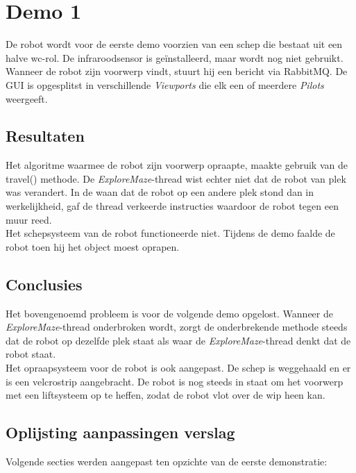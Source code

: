 \documentclass[tt2]{penoverslag}
\begin{document}
\section{Demo 1} %
\label{Asec:demo1}
De robot wordt voor de eerste demo voorzien van een schep die bestaat uit een halve wc-rol. De infraroodsensor is ge\"installeerd, maar wordt nog niet gebruikt. Wanneer de robot zijn voorwerp vindt, stuurt hij een bericht via RabbitMQ. De GUI is opgesplitst in verschillende \textit{Viewports} die elk een of meerdere \textit{Pilots} weergeeft.

\subsection{Resultaten} %
\label{Assec:result1}
Het algoritme waarmee de robot zijn voorwerp opraapte, maakte gebruik van de travel() methode. De \textit{ExploreMaze}-thread wist echter niet dat de robot van plek was verandert. In de waan dat de robot op een andere plek stond dan in werkelijkheid, gaf de thread verkeerde instructies waardoor de robot tegen een muur reed. \\
Het schepsysteem van de robot functioneerde niet. Tijdens de demo faalde de robot toen hij het object moest oprapen. 

\subsection{Conclusies} %
\label{Assec:conc1}
Het bovengenoemd probleem is voor de volgende demo opgelost. Wanneer de \textit{ExploreMaze}-thread onderbroken wordt, zorgt de onderbrekende methode steeds dat de robot op dezelfde plek staat als waar de \textit{ExploreMaze}-thread denkt dat de robot staat.\\
Het opraapsysteem voor de robot is ook aangepast. De schep is weggehaald en er is een velcrostrip aangebracht. De robot is nog steeds in staat om het voorwerp met een liftsysteem op te heffen, zodat de robot vlot over de wip heen kan.


\subsection{Oplijsting aanpassingen verslag} %
\label{Assec:aanp1}
Volgende secties werden aangepast ten opzichte van de eerste demonstratie:
\end{document}
